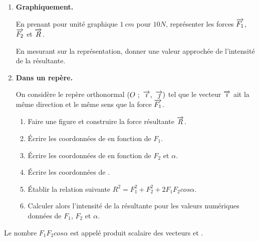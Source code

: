 \documentclass[12pt,openright,twoside,french]{book}
\begin{document}
\begin{enumerate}
    \item \textbf{Graphiquement.}\par
        En prenant pour unité graphique $1~cm$ pour $10 N$, représenter les forces $\overrightarrow{F_1}$, $\overrightarrow{F_2}$ et $\overrightarrow{R}$.\par
        En mesurant sur la représentation, donner une valeur approchée de l'intensité de la résultante.
    \item \textbf{Dans un repère.}\par
        On considère le repère orthonormal $\left(O~;~\overrightarrow{\imath},~\overrightarrow{\jmath}\right)$ tel que le vecteur $\overrightarrow{\imath}$ ait la même direction et le même sens que la force $\overrightarrow{F_1}$.
        \begin{enumerate}
            \item Faire une figure et construire la force résultante $\overrightarrow{R}$.
            \item \'Ecrire les coordonnées de  en fonction de $F_1$.
            \item \'Ecrire les coordonnées de  en fonction de $F_2$ et $\alpha$.
            \item \'Ecrire les coordonnées de .
            \item \'Etablir la relation suivante $R^2 = F_1^2 + F_2^2 + 2F_1F_2cos \alpha$.
            \item Calculer alors l'intensité de la résultante pour les valeurs numériques données de $F_1$, $F_2$ et $\alpha$.
        \end{enumerate}
\end{enumerate}\bigskip

Le nombre $F_1F_2 cos \alpha$ est appelé produit scalaire des vecteurs  et .
\end{document}
